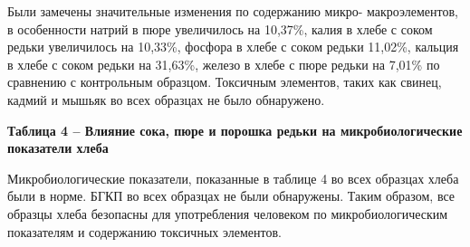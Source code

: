 Были замечены значительные изменения по содержанию микро-
макроэлементов, в особенности натрий в пюре увеличилось на 10,37\%,
калия в хлебе с соком редьки увеличилось на 10,33\%, фосфора в хлебе с
соком редьки 11,02\%, кальция в хлебе с соком редьки на 31,63\%, железо
в хлебе с пюре редьки на 7,01\% по сравнению с контрольным образцом.
Токсичным элементов, таких как свинец, кадмий и мышьяк во всех образцах
не было обнаружено.

{\bfseries Таблица 4 -- Влияние сока, пюре и порошка редьки на
микробиологические показатели хлеба}


Микробиологические показатели, показанные в таблице 4 во всех образцах
хлеба были в норме. БГКП во всех образцах не были обнаружены. Таким
образом, все образцы хлеба безопасны для употребления человеком по
микробиологическим показателям и содержанию токсичных элементов.

